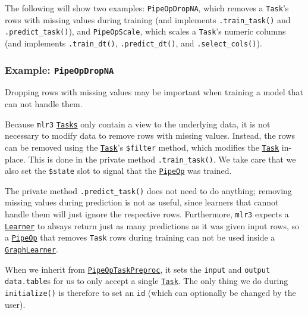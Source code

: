 \documentclass[
]{scrbook}
\begin{document}
The following will show two examples: \texttt{PipeOpDropNA}, which removes a \texttt{Task}'s rows with missing values during training (and implements \texttt{.train\_task()} and \texttt{.predict\_task()}), and \texttt{PipeOpScale}, which scales a \texttt{Task}'s numeric columns (and implements \texttt{.train\_dt()}, \texttt{.predict\_dt()}, and \texttt{.select\_cols()}).

\hypertarget{example-pipeopdropna}{%
\subsubsection{\texorpdfstring{Example: \texttt{PipeOpDropNA}}{Example: PipeOpDropNA}}\label{example-pipeopdropna}}

Dropping rows with missing values may be important when training a model that can not handle them.

Because \texttt{mlr3} \href{https://mlr3.mlr-org.com/reference/Task.html}{\texttt{Tasks}} only contain a view to the underlying data, it is not necessary to modify data to remove rows with missing values.
Instead, the rows can be removed using the \href{https://mlr3.mlr-org.com/reference/Task.html}{\texttt{Task}}'s \texttt{\$filter} method, which modifies the \href{https://mlr3.mlr-org.com/reference/Task.html}{\texttt{Task}} in-place.
This is done in the private method \texttt{.train\_task()}.
We take care that we also set the \texttt{\$state} slot to signal that the \href{https://mlr3pipelines.mlr-org.com/reference/PipeOp.html}{\texttt{PipeOp}} was trained.

The private method \texttt{.predict\_task()} does not need to do anything; removing missing values during prediction is not as useful, since learners that cannot handle them will just ignore the respective rows.
Furthermore, \texttt{mlr3} expects a \href{https://mlr3.mlr-org.com/reference/Learner.html}{\texttt{Learner}} to always return just as many predictions as it was given input rows, so a \href{https://mlr3pipelines.mlr-org.com/reference/PipeOp.html}{\texttt{PipeOp}} that removes \texttt{Task} rows during training can not be used inside a \href{https://mlr3pipelines.mlr-org.com/reference/mlr_learners_graph.html}{\texttt{GraphLearner}}.

When we inherit from \href{https://mlr3pipelines.mlr-org.com/reference/PipeOpTaskPreproc.html}{\texttt{PipeOpTaskPreproc}}, it sets the \texttt{input} and \texttt{output} \texttt{data.table}s for us to only accept a single \href{https://mlr3.mlr-org.com/reference/Task.html}{\texttt{Task}}.
The only thing we do during \texttt{initialize()} is therefore to set an \texttt{id} (which can optionally be changed by the user).
\end{document}
